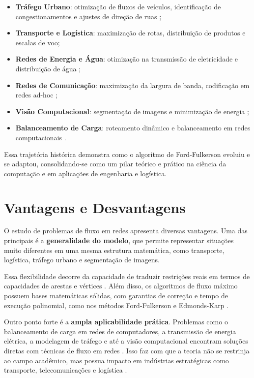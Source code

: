 \documentclass[12pt]{article}
\begin{document}
\begin{itemize}
    \item \textbf{Tráfego Urbano}: otimização de fluxos de veículos, identificação de congestionamentos e ajustes de direção de ruas \cite{saidane2002traffic, gupta2016traffic, dolgopolov2019traffic, gong2022traffic, iemini1994dynamic};
    \item \textbf{Transporte e Logística}: maximização de rotas, distribuição de produtos e escalas de voo;
    \item \textbf{Redes de Energia e Água}: otimização na transmissão de eletricidade e distribuição de água \cite{bulut2021optimization};
    \item \textbf{Redes de Comunicação}: maximização da largura de banda, codificação em redes ad-hoc \cite{neto2015communication, zhang2005ad};
    \item \textbf{Visão Computacional}: segmentação de imagens e minimização de energia \cite{boykov2001};
    \item \textbf{Balanceamento de Carga}: roteamento dinâmico e balanceamento em redes computacionais \cite{tsiaka2008load, peijun2011routing}.
\end{itemize}


Essa trajetória histórica demonstra como o algoritmo de Ford-Fulkerson evoluiu e se adaptou, consolidando-se como um pilar teórico e prático na ciência da computação e em aplicações de engenharia e logística.


\section{Vantagens e Desvantagens} \label{sec:vantagens}

O estudo de problemas de fluxo em redes apresenta diversas vantagens. Uma das principais é a \textbf{generalidade do modelo}, que permite representar situações muito diferentes em uma mesma estrutura matemática, como transporte, logística, tráfego urbano e segmentação de imagens. 

\noindent Essa flexibilidade decorre da capacidade de traduzir restrições reais em termos de capacidades de arestas e vértices \cite{ahuja1993,cormen2009}. Além disso, os algoritmos de fluxo máximo possuem bases matemáticas sólidas, com garantias de correção e tempo de execução polinomial, como nos métodos Ford-Fulkerson e Edmonds-Karp \cite{ford1956maximal,edmonds1972}. 

\noindent Outro ponto forte é a \textbf{ampla aplicabilidade prática}. Problemas como o balanceamento de carga em redes de computadores, a transmissão de energia elétrica, a modelagem de tráfego e até a visão computacional encontram soluções diretas com técnicas de fluxo em redes \cite{boykov2004experimental,gupta2016traffic,gong2022traffic}. Isso faz com que a teoria não se restrinja ao campo acadêmico, mas possua impacto em indústrias estratégicas como transporte, telecomunicações e logística \cite{kleinberg2006}.
\end{document}
